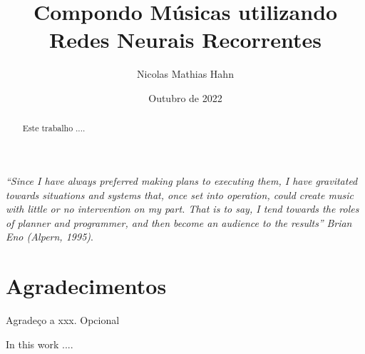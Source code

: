 \documentclass{automatextcc}
\begin{document}
\title{Compondo Músicas utilizando Redes Neurais Recorrentes}
\author{Nicolas Mathias Hahn}



\dept{\DEST}

\date{Outubro de 2022}


\maketitulo

\makefolhaderosto

\makefolhadeaprovacaoA %


\newpage
\vspace*{\fill}
\begin{flushright} %
	\textit{``Since I have always preferred making plans to executing them, I have gravitated towards situations and systems that, once set into operation, could create music with little or no intervention on my part. That is to say, I tend towards the roles of planner and programmer, and then become an audience to the results''} \newline
	\textit{Brian Eno (Alpern, 1995)}.
\end{flushright}

\newpage
\chapter*{Agradecimentos}
Agradeço a xxx. Opcional %


\begin{abstract}
Este trabalho ....
\end{abstract}
\begin{englishabstract}
In this work ....
\end{englishabstract}

\tableofcontents

\listoffigures
\end{document}
